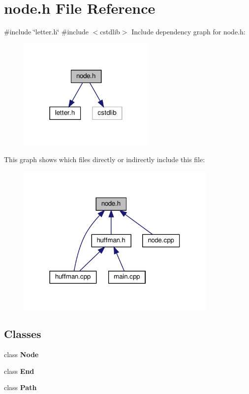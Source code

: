 \section{node.\+h File Reference}
\label{node_8h}
{\ttfamily \#include \char`\"{}letter.\+h\char`\"{}}\newline
{\ttfamily \#include $<$cstdlib$>$}\newline
Include dependency graph for node.\+h\+:
\nopagebreak
\begin{figure}[H]
\begin{center}
\leavevmode
\includegraphics[width=190pt]{node_8h__incl}
\end{center}
\end{figure}
This graph shows which files directly or indirectly include this file\+:
\nopagebreak
\begin{figure}[H]
\begin{center}
\leavevmode
\includegraphics[width=278pt]{node_8h__dep__incl}
\end{center}
\end{figure}
\subsection*{Classes}
\begin{DoxyCompactItemize}
\item 
class \textbf{ Node}
\item 
class \textbf{ End}
\item 
class \textbf{ Path}
\end{DoxyCompactItemize}
